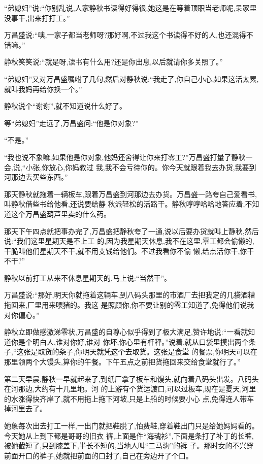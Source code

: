 ﻿\documentclass[12pt]{article}
\begin{document}
``弟媳妇''说:``你别乱说,人家静秋书读得好得很,她这是在等着顶职当老师呢,呆家里没事干,出来打打工。''

万昌盛说:``噢,一家子都当老师呀?那好啊,不过我这个书读得不好的人,也还混得不错嘛。''

静秋笑笑说:``就是呀,读书有什么用?还是你出息,以后就请你多关照了。''

``弟媳妇''又对万昌盛嘱咐了几句,然后对静秋说:``我走了,你自己小心,如果这活太累,就叫我妈再给你换一个。''

静秋说个``谢谢'',就不知道说什么好了。

等``弟媳妇''走远了,万昌盛问:``他是你对象?''

``不是。''

``我也说不象嘛,如果他是你对象,他妈还舍得让你来打零工?''万昌盛打量了静秋一会,说,``小张,你放心,你妈教过
我,我不会亏待你的。你今天就跟着我去办货,我要到河那边去买些东西。''


那天静秋就拖着一辆板车,跟着万昌盛到河那边去办货。万昌盛一路夸自己爱看书,叫静秋借些书给他看,还说要给静
秋派轻松的活路干。静秋哼哼哈哈地答应着,不知道这个万昌盛葫芦里卖的什么药。

那天下午四点就把事办完了,万昌盛把静秋夸了一通,说以后要办货就叫上静秋,然后说:``我们这里星期天是不上工
的,因为我星期天休息,我不在这里,零工都会偷懒的,干脆叫他们星期天不干,就不用支钱给他们。不过我看你不偷
懒,给点活你干,你干不干?''

静秋以前打工从来不休息星期天的,马上说:``当然干''。

万昌盛说:``那好,明天你就拖着这辆车,到八码头那里的市酒厂去把我定的几袋酒糟拖回来,厂里用来喂猪的。我这
是照顾你,你不要让别的零工知道了,免得他们说我对你偏心。''

静秋立即做感激涕零状,万昌盛的自尊心似乎得到了极大满足,赞许地说:``一看就知道你是个明白人,谁对你好,谁对
你坏,你心里有杆秤。''说着,就从口袋里摸出两个条子,``这张是取货的条子,你明天就凭这个去取货。这张是食堂
的餐票,你明天可以在那里领两个大馒头,算你的午餐。下午五点之前把货拖回来交给食堂就行了。''

第二天早晨,静秋一早就起来了,到纸厂拿了板车和馒头,就向着八码头出发。八码头在河那边,大约有十几里地。河
的上游有个货运渡口,可以过板车,现在是夏天,河里的水涨得快齐岸了,就不用拖上拖下河坡,只是上船的时候要小心
点,免得连人带车掉河里去了。

她象每次出去打工一样,一出门就把鞋脱了,怕费鞋,穿着鞋出门只是给她妈妈看的。今天她从上到下都是哥哥的旧衣
裤,上面是件``海魂衫'',下面是条打了补丁的长裤,被她截短了,只到膝盖下,半长不短的,当地人叫``二马驹''的裤
子。那时女的不兴穿前面开口的裤子,她就把前面的口封了,自己在旁边开了个口。
\end{document}
